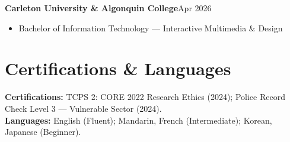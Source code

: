\documentclass[letterpaper,11pt]{article}
\newcommand{\roleline}[2]{%
  \textbf{\large #1}\hfill{\small #2}\\[-2pt]
}
\begin{document}
\roleline{Carleton University \& Algonquin College}{Apr 2026}
\begin{itemize}\footnotesize
  \item Bachelor of Information Technology --- Interactive Multimedia \& Design
\end{itemize}

\section{Certifications \& Languages}
{\footnotesize
\textbf{Certifications:} TCPS 2: CORE 2022 Research Ethics (2024); Police Record Check Level 3 --- Vulnerable Sector (2024). \\
\textbf{Languages:} English (Fluent); Mandarin, French (Intermediate); Korean, Japanese (Beginner).
}
\end{document}
